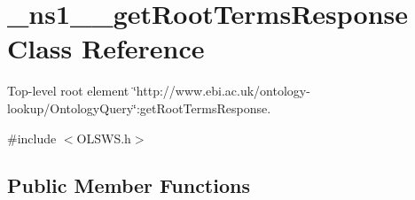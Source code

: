 \hypertarget{class__ns1____getRootTermsResponse}{
\section{\_\-ns1\_\-\_\-getRootTermsResponse Class Reference}
\label{class__ns1____getRootTermsResponse}
}


Top-\/level root element \char`\"{}http://www.ebi.ac.uk/ontology-\/lookup/OntologyQuery\char`\"{}:getRootTermsResponse.  




{\ttfamily \#include $<$OLSWS.h$>$}

\subsection*{Public Member Functions}
